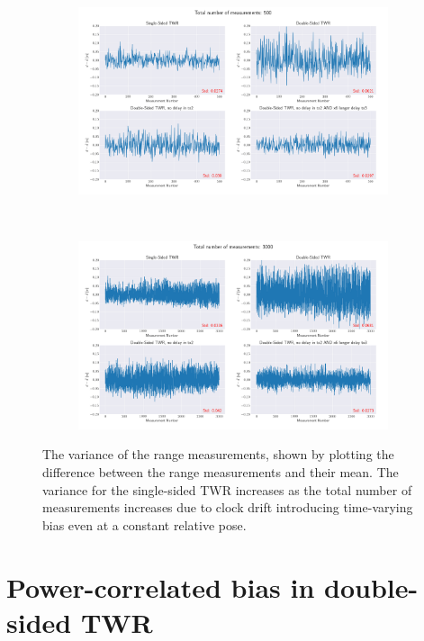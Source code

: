 \documentclass{decar-wsd}    %
\begin{document}
\begin{figure}[h]
    \centering
    \begin{subfigure}[t]{\textwidth}
        \centering
        \includegraphics[width=0.8\columnwidth]{figs/std_comparison_500.png}
    \end{subfigure} \\
    \begin{subfigure}[t]{\textwidth}
        \centering
        \includegraphics[width=0.8\columnwidth]{figs/std_comparison_3000.png}
    \end{subfigure}
    \caption{The variance of the range measurements, shown by plotting the difference between the range measurements and their mean. The variance for the single-sided TWR increases as the total number of measurements increases due to clock drift introducing time-varying bias even at a constant relative pose.}
    \label{fig:range_variance}
\end{figure}

\clearpage
\section{Power-correlated bias in double-sided TWR}
\end{document}
